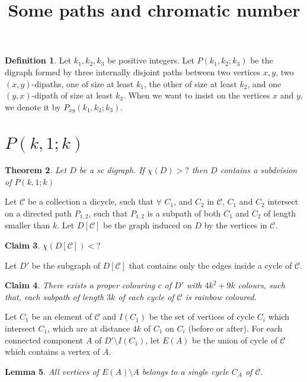 \documentclass[10pt]{article}
\title{Some paths and chromatic number}
\theoremstyle{plain}
\newtheorem{theorem}{Theorem}
\newtheorem{lemma}[theorem]{Lemma}
\newtheorem{claim}[theorem]{Claim}
\theoremstyle{definition}
\newtheorem{definition}[theorem]{Definition}
\theoremstyle{remark}
\begin{document}
\begin{definition}
Let $k_1,k_2,k_3$ be positive integers. Let $P(k_1,k_2;k_3)$ be the digraph formed by three internally disjoint paths between two vertices $x,y$, two $(x,y)$-dipaths, one of size at least $k_1$, the other of size at least $k_2$, and one $(y,x)$-dipath of size at least $k_3$.
When we want to insist on the vertices $x$ and $y$, we denote it by $P_{xy}(k_1,k_2;k_3)$.
\end{definition}




\section{$P(k,1;k)$}

\begin{theorem}
Let $D$ be a sc digraph. If $\chi(D) > ?$ then $D$ contains a subdvision of $P(k,1;k)$
\end{theorem}

Let $\mathcal{C}$ be a collection a dicycle, such that $\forall$ $C_1$, and $C_2$ in $\mathcal{C}$, $C_1$ and $C_2$ intersect on 
a directed path $P_{1,2}$, such that $P_{1,2}$ is a subpath of both $C_1$ and $C_2$ of length smaller than $k$.
Let $D[\mathcal{C}]$ be the graph induced on $D$ by the vertices in $\mathcal{C}$.

\begin{claim}\label{DC}
$\chi(D[\mathcal{C}]) < ? $
\end{claim}

Let $D'$ be the subgraph of $D[\mathcal{C}]$ that contains only the edges inside a cycle of  $\mathcal{C}$.


\begin{claim}
There exists a proper colouring $c$ of $D'$ with $4k^2 + 9k$ colours, such that, each subpath of length $3k$ of each cycle of $\mathcal{C}$ is rainbow coloured. 
\end{claim}

Let $C_1$ be an element of $\mathcal{C}$ and $I(C_1)$ be the set of vertices of cycle $C_i$ which intersect $C_1$, which are at distance $4k$ 
of $C_1$ on $C_i$ (before or after). For each connected component $A$ 
of $D'\setminus I(C_1)$, let $E(A)$ be the union of cycle of $\mathcal{C}$ which contains a vertex of $A$. 


\begin{lemma}\label{A}
All vertices of $E(A) \setminus A$ belongs to a single cycle $C_A$ of $\mathcal{C}$.
\end{lemma}
\end{document}
